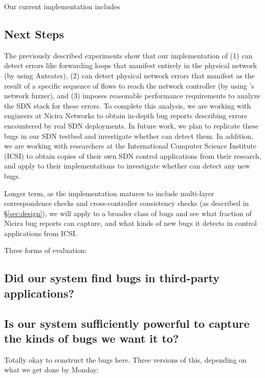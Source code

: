     Our current implementation includes

    \subsection{Next Steps}
        The previously described experiments show that our implementation of \projectname{} (1) can detect errors like forwarding loops that manifest entirely in the physical network (by using Anteater), (2) can detect physical network errors that manifest as the result of a specific sequence of flows to reach the network controller (by using \projectname{}'s network fuzzer), and (3) imposes reasonable performance requirements to analyze the SDN stack for these errors.
        To complete this analysis, we are working with engineers at Nicira Networks to obtain in-depth bug reports describing errors encountered by real SDN deployments.
        In future work, we plan to replicate these bugs in our SDN testbed and investigate whether \projectname{} can detect them.
        In addition, we are working with researchers at the International Computer Science Institute (ICSI) to obtain copies of their own SDN control applications from their research, and apply \projectname{} to their implementations to investigate whether \projectname{} can detect any new bugs.

        Longer term, as the \projectname{} implementation matures to include multi-layer correspondence checks and cross-controller consistency checks (as described in \S\ref{sec:design}), we will apply \projectname{} to a broader class of bugs and see what fraction of Nicira bug reports \projectname{} can capture, and what kinds of new bugs it detects in control applications from ICSI. 

Three forms of evaluation:

\subsection{Did our system find bugs in third-party applications?}

\subsection{Is our system sufficiently powerful to capture the kinds of bugs we want
it to?}

Totally okay to construct the bugs here. Three versions of this, depending on what we get done by Monday:

